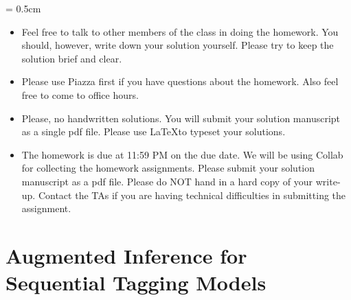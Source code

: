 
\usepackage{graphicx}
\usepackage{subfigure}
\usepackage{amsmath}
\usepackage{amssymb}
\usepackage{epsfig}
\usepackage{enumerate}
\usepackage{color}
\usepackage{algorithmic}
\usepackage{hyperref}


\sloppy
\parskip = 0.5cm

\newcommand{\ignore}[1]{}
\newcommand{\pp}{\noindent}
\newcommand{\ov}{\overline}
\newcommand{\bb}[1]{{\bf #1}}
\renewcommand{\labelitemii}{\tiny$\circ$}

\newcommand{\question}[1]{#1}%
%
\newcommand{\answer}[2]{{
\vspace{10pt} 
\color{red}{#2}
\vspace{10pt}
}
}
\newcommand{\comment}[1]{}


\oddsidemargin 0in
\evensidemargin 0in
\textwidth 6.5in
\topmargin -0.5in
\textheight 9.0in


\setlength{\unitlength}{1mm}

\thispagestyle{plain}
\newpage
{}

\begin{itemize}
\item Feel free to talk to other members of the class in doing the homework. You should, however,
write down your solution yourself.  Please try to keep the solution brief and clear.

\item Please use Piazza first if you have questions about the homework. Also feel free to come to office hours.

\item Please, no handwritten solutions. You will submit your solution manuscript as a single pdf file. Please use \LaTeX to typeset your solutions.

\item The homework is due at 11:59 PM on the due date. We will be using
Collab for collecting the homework assignments. Please submit your solution manuscript as a pdf file.  Please do NOT hand in a hard copy of your write-up.
Contact the TAs if you are having technical difficulties in 
submitting the assignment. 
\end{itemize}



\section{Augmented Inference for Sequential Tagging Models} 

